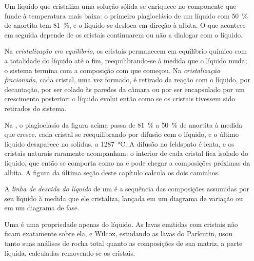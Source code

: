 Um líquido que cristaliza uma solução sólida se enriquece no componente que
funde à temperatura mais baixa: o primeiro plagioclásio de um líquido com
\qty{50}{\percent} de anortita tem \qty{81}{\percent}, e o líquido se desloca em direção à
albita. O que acontece em seguida depende de os cristais continuarem ou não a dialogar com o
líquido.

\begin{definition}
\label{def:b2:magmatic-differentiation:crystallisation}
Na \emph{cristalização em equilíbrio}, os
cristais permanecem em equilíbrio químico com a totalidade do líquido até o
fim, reequilibrando-se à medida que o líquido muda; o sistema termina com a composição
com que começou. Na \emph{cristalização fracionada},
cada cristal, uma vez formado, é retirado da reação com o
líquido, por decantação, por ser colado às paredes da câmara ou por ser
encapsulado por um crescimento posterior; o líquido evolui então como se os cristais tivessem
sido retirados do sistema.
\end{definition}

Na , o plagioclásio da figura acima passa de
\qty{81}{\percent} a \qty{50}{\percent} de anortita à medida que cresce, cada cristal
se reequilibrando por difusão com o líquido, e o último líquido desaparece no
solidus, a \qty{1287}{\celsius}. A difusão no feldspato é lenta, e os cristais naturais
raramente acompanham: o interior de cada cristal fica isolado do líquido,
que então se comporta como na  e pode chegar a composições
próximas da albita. A figura da última seção deste capítulo calcula os dois caminhos.

\begin{definition}\label{def:b2:magmatic-differentiation:lld}
A \emph{linha de descida do líquido} de um  é a
sequência das composições assumidas por seu líquido à medida que ele cristaliza, lançada em um
diagrama de variação ou em um diagrama de fase.
\end{definition}

Uma  é uma propriedade apenas do líquido. As lavas emitidas com
cristais não ficam exatamente sobre ela, e Wilcox, estudando as lavas do
Parícutin, usou tanto suas análises de rocha total quanto as composições de sua
matriz, a parte líquida, calculadas removendo-se os cristais.

